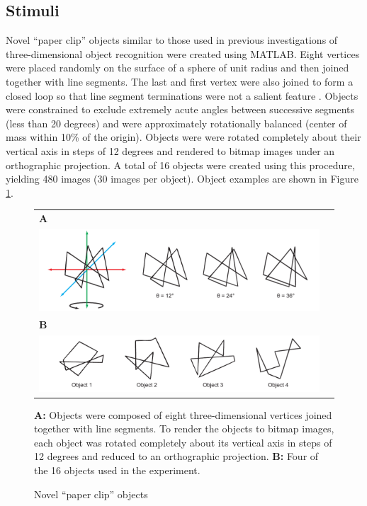 \documentclass[dwyatte_dissertation.tex]{subfiles}
\begin{document}
\subsection{Stimuli}
Novel ``paper clip'' objects similar to those used in previous investigations of three-dimensional object recognition \cite{BulthoffEdelman92,EdelmanBulthoff92,LogothetisPaulsBulthoffEtAl94,LogothetisPaulsPoggio95,SinhaPoggio96} were created using MATLAB. Eight vertices were placed randomly on the surface of a sphere of unit radius and then joined together with line segments. The last and first vertex were also joined to form a closed loop so that line segment terminations were not a salient feature \cite{BalasSinha09b}. Objects were constrained to exclude extremely acute angles between successive segments (less than 20 degrees) and were approximately rotationally balanced (center of mass within 10\% of the origin). Objects were were rotated completely about their vertical axis in steps of 12 degrees and rendered to bitmap images under an orthographic projection. A total of 16 objects were created using this procedure, yielding 480 images (30 images per object). Object examples are shown in Figure \ref{fig:pleast_objs}.

\begin{figure}[h!]
\begin{center}
\begin{tabular}{ll}
\textbf{A} \\
\includegraphics[width=160mm]{figs/chap_pleast/paperclip_rots.pdf} \\
\textbf{B} \\
\includegraphics[width=160mm]{figs/chap_pleast/paperclip_objs.pdf} \\
\end{tabular}
\end{center}
\caption{Novel ``paper clip'' objects}{\textbf{A:} Objects were composed of eight three-dimensional vertices joined together with line segments. To render the objects to bitmap images, each object was rotated completely about its vertical axis in steps of 12 degrees and reduced to an orthographic projection. \textbf{B:} Four of the 16 objects used in the experiment.}
\label{fig:pleast_objs}
\end{figure}
\end{document}
